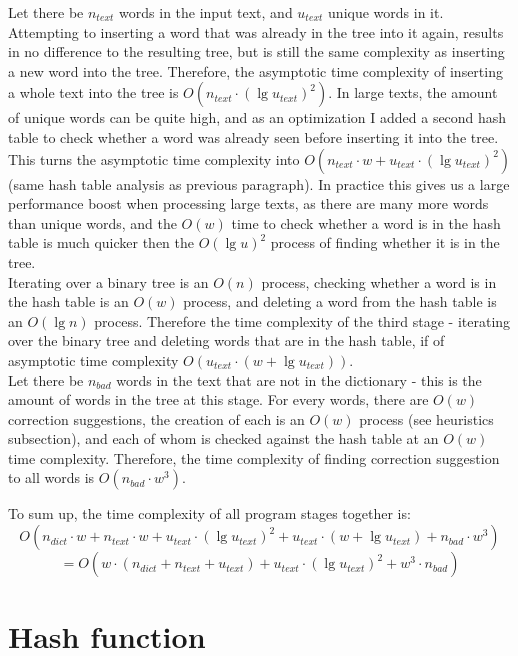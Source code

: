 \documentclass[a4paper]{article}
\begin{document}
Let there be $n_{text}$ words in the input text, and $u_{text}$ unique words in it. Attempting to inserting a word that was already in the tree into it again, results in no difference to the resulting tree, but is still the same complexity as inserting a new word into the tree. Therefore, the asymptotic time complexity of inserting a whole text into the tree is $O(n_{text}\cdot(\lg u_{text})^2)$. In large texts, the amount of unique words can be quite high, and as an optimization I added a second hash table to check whether a word was already seen before inserting it into the tree. This turns the asymptotic time complexity into $O(n_{text}\cdot w + u_{text} \cdot(\lg u_{text})^2)$ (same hash table analysis as previous paragraph). In practice this gives us a large performance boost when processing large texts, as there are many more words than unique words, and the $O(w)$ time to check whether a word is in the hash table is much quicker then the $O(\lg u)^2$ process of finding whether it is in the tree.\\

Iterating over a binary tree is an $O(n)$ process, checking whether a word is in the hash table is an $O(w)$ process, and deleting a word from the hash table is an $O(\lg n)$ process. Therefore the time complexity of the third stage - iterating over the binary tree and deleting words that are in the hash table, if of asymptotic time complexity $O(u_{text}\cdot(w + \lg u_{text}))$.\\

Let there be $n_{bad}$ words in the text that are not in the dictionary - this is the amount of words in the tree at this stage. For every words, there are $O(w)$ correction suggestions, the creation of each is an $O(w)$ process (see heuristics subsection), and each of whom is checked against the hash table at an $O(w)$ time complexity. Therefore, the time complexity of finding correction suggestion to all words is $O(n_{bad}\cdot w^3)$.

To sum up, the time complexity of all program stages together is:
\[ O(n_{dict}\cdot w + n_{text}\cdot w + u_{text} \cdot (\lg u_{text})^2 + u_{text}\cdot(w + \lg u_{text}) + n_{bad}\cdot w^3) \]
\[ = O(w\cdot(n_{dict} + n_{text} + u_{text}) + u_{text} \cdot (\lg u_{text})^2 + w^3\cdot n_{bad}) \]

\section{Hash function}
\end{document}
